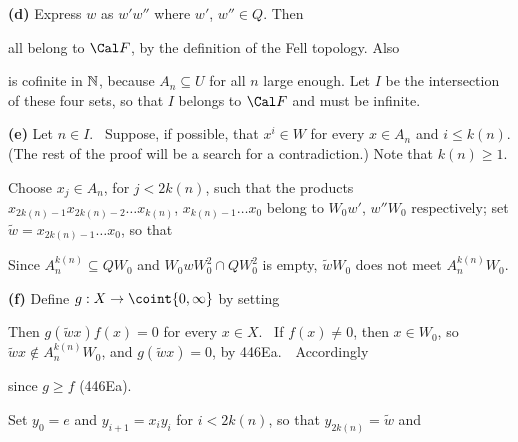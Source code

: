 {\medskip

{\bf (d)} Express $w$ as $w'w''$ where $w'$, $w''\in Q$.   Then



\noindent all belong to $\Cal F$, by the definition of the Fell topology.
Also


\noindent is cofinite in $\Bbb N$, because $A_n\subseteq U$ for all $n$
large enough.   Let $I$ be the intersection of these four sets, so that
$I$ belongs to $\Cal F$ and must be infinite.

\medskip

{\bf (e)} Let $n\in I$.   \Quer\ Suppose, if possible, that $x^i\in W$
for every $x\in A_n$ and $i\le k(n)$.   (The rest of the proof will be a
search for a contradiction.)   Note that $k(n)\ge 1$.

Choose $x_j\in A_n$, for $j<2k(n)$, such that the products
$x_{2k(n)-1}x_{2k(n)-2}\ldots x_{k(n)}$,
$x_{k(n)-1}\ldots x_{0}$ belong to $W_0w'$, $w''W_0$ respectively;  set
$\tilde w=x_{2k(n)-1}\ldots x_0$, so that


\noindent Since $A_n^{k(n)}\subseteq QW_0$ and $W_0wW_0^2\cap QW_0^2$ is
empty, $\tilde wW_0$ does not meet $A_n^{k(n)}W_0$.

\medskip

{\bf (f)} Define $g:X\to\coint{0,\infty}$ by setting


\noindent Then $g(\tilde wx)f(x)=0$ for every $x\in X$.   \Prf\ If
$f(x)\ne 0$, then $x\in W_0$, so $\tilde wx\notin A_n^{k(n)}W_0$, and
$g(\tilde wx)=0$, by 446Ea.\ \QeD\  Accordingly


\noindent since $g\ge f$ (446Ea).

Set $y_0=e$ and $y_{i+1}=x_{i}y_i$ for $i<2k(n)$, so that
$y_{2k(n)}=\tilde w$ and


}
